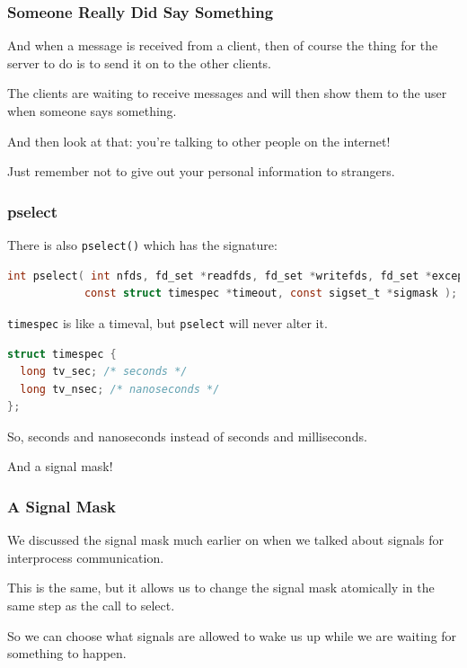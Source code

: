 \begin{frame}
\frametitle{Someone Really Did Say Something}

And when a message is received from a client, then of course the thing for the server to do is to send it on to the other clients.

The clients are waiting to receive messages and will then show them to the user when someone says something. 

And then look at that: you're talking to other people on the internet! 

Just remember not to give out your personal information to strangers.

\end{frame}

\begin{frame}[fragile]
\frametitle{pselect}

There is also \texttt{pselect()} which has the signature:
\begin{lstlisting}[language=C]
int pselect( int nfds, fd_set *readfds, fd_set *writefds, fd_set *exceptfds, 
            const struct timespec *timeout, const sigset_t *sigmask );
\end{lstlisting}

\texttt{timespec} is like a timeval, but \texttt{pselect} will never alter it.

\begin{lstlisting}[language=C]
struct timespec {
  long tv_sec; /* seconds */
  long tv_nsec; /* nanoseconds */
};
\end{lstlisting}

So, seconds and nanoseconds instead of seconds and milliseconds.

And a signal mask!

\end{frame}


\begin{frame}
\frametitle{A Signal Mask}

We discussed the signal mask much earlier on when we talked about signals for interprocess communication. 

This is the same, but it allows us to change the signal mask atomically in the same step as the call to select. 

So we can choose what signals are allowed to wake us up while we are waiting for something to happen.


\end{frame}

